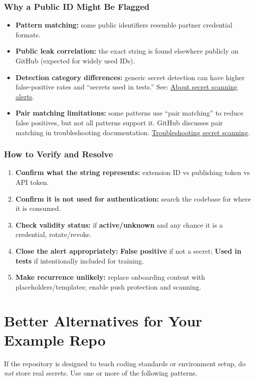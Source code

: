 \documentclass[11pt]{article}
\providecommand{\term}[1]{\textbf{#1}}
\begin{document}
\subsubsection{Why a Public ID Might Be Flagged}
\begin{itemize}
  \item \textbf{Pattern matching:} some public identifiers resemble partner credential formats.
  \item \textbf{Public leak correlation:} the exact string is found elsewhere publicly on GitHub (expected for widely used IDs).
  \item \textbf{Detection category differences:} generic secret detection can have higher false-positive rates and ``secrets used in tests.'' See: \href{https://docs.github.com/en/code-security/concepts/secret-security/about-alerts}{About secret scanning alerts}.
  \item \textbf{Pair matching limitations:} some patterns use ``pair matching'' to reduce false positives, but not all patterns support it. GitHub discusses pair matching in troubleshooting documentation. \href{https://docs.github.com/en/code-security/secret-scanning/troubleshooting-secret-scanning-and-push-protection/troubleshooting-secret-scanning}{Troubleshooting secret scanning}.
\end{itemize}

\subsubsection{How to Verify and Resolve}
\begin{enumerate}
  \item \textbf{Confirm what the string represents:} extension ID vs publishing token vs API token.
  \item \textbf{Confirm it is not used for authentication:} search the codebase for where it is consumed.
  \item \textbf{Check validity status:} if \term{active/unknown} and any chance it is a credential, rotate/revoke.
  \item \textbf{Close the alert appropriately:} \term{False positive} if not a secret; \term{Used in tests} if intentionally included for training.
  \item \textbf{Make recurrence unlikely:} replace onboarding content with placeholders/templates; enable push protection and scanning.
\end{enumerate}

\section{Better Alternatives for Your Example Repo}
If the repository is designed to teach coding standards or environment setup, do \emph{not} store real secrets. Use one or more of the following patterns.
\end{document}
